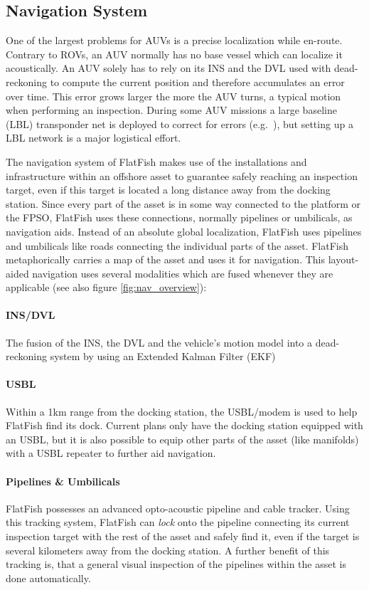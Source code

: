 \documentclass[conference]{IEEEtran}
\begin{document}
\subsection{Navigation System}
\label{sec:nav}

One of the largest problems for AUVs is a precise localization while en-route. Contrary to 
ROVs, an AUV normally has no base vessel which can localize it acoustically. An AUV solely 
has to rely on its INS and the DVL used with dead-reckoning to compute the current 
position and therefore accumulates an error over time. This error grows larger the 
more the AUV turns, a typical motion when performing an inspection. During some AUV missions 
a large baseline (LBL) transponder net is deployed to correct for errors 
(e.g.~\cite{purcell2011}), but setting up a LBL network is a major logistical effort.

The navigation system of FlatFish makes use of the installations and infrastructure within an 
offshore asset to guarantee safely reaching an inspection target, even if this target is 
located a long distance away from the docking station. Since every part of the asset is in some way connected to the platform or the FPSO, FlatFish uses these 
connections, normally pipelines or umbilicals, as navigation aids. Instead of an absolute 
global localization, FlatFish uses pipelines and umbilicals like roads connecting the individual 
parts of the asset. FlatFish metaphorically carries a map of the asset and uses it for navigation. This layout-aided navigation uses several modalities which are 
fused whenever they are applicable (see also figure \ref{fig:nav_overview}):
\paragraph*{\textbf{INS/DVL}} The fusion of the INS, the DVL and the vehicle's motion 
model into  a dead-reckoning system by using an Extended Kalman Filter (EKF)
\paragraph*{\textbf{USBL}} Within a 1km range from the docking station, the USBL/modem is 
used to help FlatFish find its dock. Current plans only have the docking 
station equipped with an USBL, but it is also possible to equip other parts of the asset (like 
manifolds) with a USBL repeater to further aid navigation.
\paragraph*{\textbf{Pipelines \& Umbilicals}} FlatFish possesses an advanced 
opto-acoustic pipeline and cable tracker. Using this tracking system, FlatFish can \textit{lock} onto the pipeline connecting its current inspection target with the rest 
of the asset and safely find it, even if the target is several kilometers away from the docking 
station. A further benefit of this tracking is, that a general visual inspection of the pipelines 
within the asset is done automatically.
\end{document}
